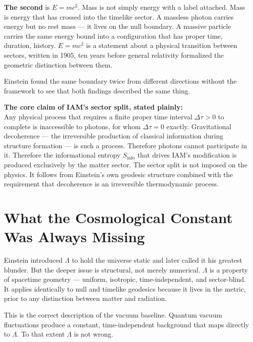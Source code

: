 \documentclass[12pt]{article}
\begin{document}
\textbf{The second} is $E = mc^2$. Mass is not simply energy with a
label attached. Mass is energy that has crossed into the timelike sector.
A massless photon carries energy but no rest mass — it lives on the null
boundary. A massive particle carries the same energy bound into a
configuration that has proper time, duration, history. $E = mc^2$ is a
statement about a physical transition between sectors, written in 1905,
ten years before general relativity formalized the geometric distinction
between them.

Einstein found the same boundary twice from different directions without
the framework to see that both findings described the same thing.

\begin{notebox}
\noindent\textbf{The core claim of IAM's sector split, stated plainly:}\\[4pt]
Any physical process that requires a finite proper time interval
$\Delta\tau > 0$ to complete is inaccessible to photons, for whom
$\Delta\tau = 0$ exactly. Gravitational decoherence — the irreversible
production of classical information during structure formation — is such
a process. Therefore photons cannot participate in it. Therefore the
informational entropy $S_\mathrm{info}$ that drives IAM's modification
is produced exclusively by the matter sector. The sector split is not
imposed on the physics. It follows from Einstein's own geodesic
structure combined with the requirement that decoherence is an
irreversible thermodynamic process.
\end{notebox}


\section{What the Cosmological Constant Was Always Missing}

Einstein introduced $\Lambda$ to hold the universe static and later
called it his greatest blunder. But the deeper issue is structural, not
merely numerical. $\Lambda$ is a property of spacetime geometry — uniform,
isotropic, time-independent, and sector-blind. It applies identically to
null and timelike geodesics because it lives in the metric, prior to any
distinction between matter and radiation.

This is the correct description of the vacuum baseline. Quantum vacuum
fluctuations produce a constant, time-independent background that maps
directly to $\Lambda$. To that extent $\Lambda$ is not wrong.
\end{document}
